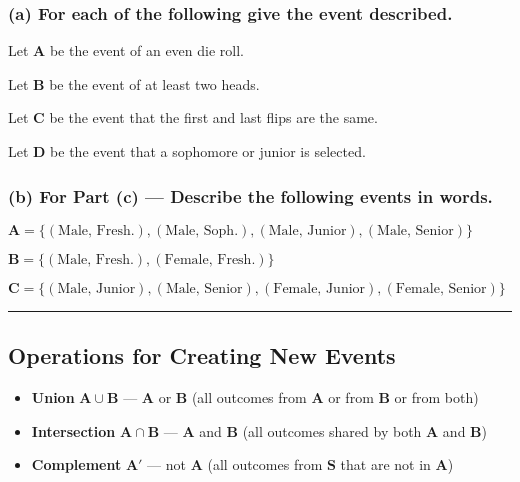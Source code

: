 \documentclass{report}
\begin{document}
\subsubsection*{(a) For each of the following give the event described.}

\begin{myenumerate}
    \item Let $\mathbf{A}$ be the event of an even die roll.
      \subitem 
    \item Let $\mathbf{B}$ be the event of at least two heads.
    \item Let $\mathbf{C}$ be the event that the first and last flips are the same.
    \item Let $\mathbf{D}$ be the event that a sophomore or junior is selected.
\end{myenumerate}

\subsubsection*{(b) For Part (c) --- Describe the following events in words.}

\begin{myenumerate}
    \item $\mathbf{A} = \{(\text{Male, Fresh.}), (\text{Male, Soph.}), (\text{Male, Junior}), (\text{Male, Senior})\}$
    \item $\mathbf{B} = \{(\text{Male, Fresh.}), (\text{Female, Fresh.})\}$
    \item $\mathbf{C} = \{(\text{Male, Junior}), (\text{Male, Senior}), (\text{Female, Junior}), (\text{Female, Senior})\}$
\end{myenumerate}
\bigbreak \noindent \bigbreak \noindent
\hrule
\bigbreak
\subsection*{Operations for Creating New Events}

\begin{itemize}
    \item \textbf{Union} $\mathbf{A \cup B}$ --- $\mathbf{A}$ or $\mathbf{B}$ (all outcomes from $\mathbf{A}$ or from $\mathbf{B}$ or from both)
    \item \textbf{Intersection} $\mathbf{A \cap B}$ --- $\mathbf{A}$ and $\mathbf{B}$ (all outcomes shared by both $\mathbf{A}$ and $\mathbf{B}$)
    \item \textbf{Complement} $\mathbf{A'}$ --- not $\mathbf{A}$ (all outcomes from $\mathbf{S}$ that are not in $\mathbf{A}$)
\end{itemize}
\bigbreak \noindent
\end{document}
